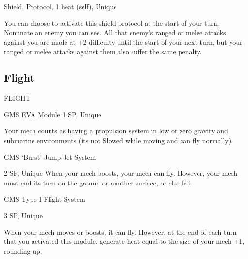 Shield, Protocol, 1 heat (self), Unique
 

                                                                                                                       


You can choose to activate this shield protocol at the start of your turn. Nominate an enemy you  
can see. All that enemy’s ranged or melee attacks against you are made at +2 difficulty until the  
start of your next turn, but your ranged or melee attacks against them also suffer the same  
penalty.
\subsection{Flight}

                                                   FLIGHT  

GMS EVA Module  
1 SP, Unique  

Your mech counts as having a propulsion system in low or zero gravity and submarine  
environments (its not Slowed while moving and can fly normally).
 

GMS ‘Burst’ Jump Jet System
 
2 SP, Unique  
When your mech boosts, your mech can fly. However, your mech must end its turn on the  
ground or another surface, or else fall.
 

GMS Type I Flight System  

3 SP, Unique
 
When your mech moves or boosts, it can fly. However, at the end of each turn that you activated  
this module, generate heat equal to the size of your mech +1, rounding up.
 

                                                                                                                
